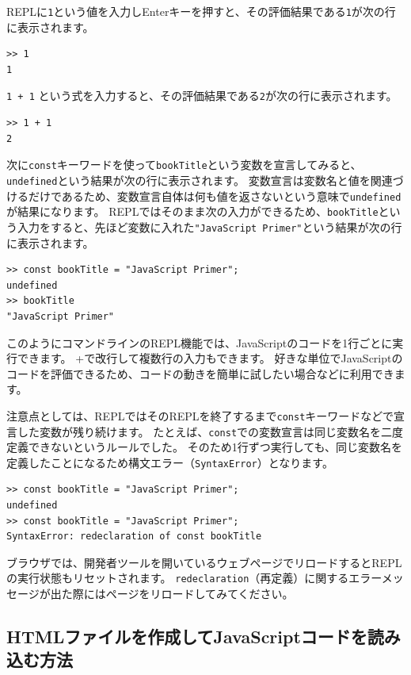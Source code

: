 REPLに\texttt{1}という値を入力しEnterキーを押すと、その評価結果である\texttt{1}が次の行に表示されます。

\begin{lstlisting}
>> 1
1
\end{lstlisting}

\texttt{1 + 1}
という式を入力すると、その評価結果である\texttt{2}が次の行に表示されます。

\begin{lstlisting}
>> 1 + 1
2
\end{lstlisting}

次に\texttt{const}キーワードを使って\texttt{bookTitle}という変数を宣言してみると、\texttt{undefined}という結果が次の行に表示されます。
変数宣言は変数名と値を関連づけるだけであるため、変数宣言自体は何も値を返さないという意味で\texttt{undefined}が結果になります。
REPLではそのまま次の入力ができるため、\texttt{bookTitle}という入力をすると、先ほど変数に入れた\texttt{"JavaScript Primer"}という結果が次の行に表示されます。

\begin{lstlisting}
>> const bookTitle = "JavaScript Primer";
undefined
>> bookTitle
"JavaScript Primer"
\end{lstlisting}

このようにコマンドラインのREPL機能では、JavaScriptのコードを1行ごとに実行できます。
+で改行して複数行の入力もできます。
好きな単位でJavaScriptのコードを評価できるため、コードの動きを簡単に試したい場合などに利用できます。

注意点としては、REPLではそのREPLを終了するまで\texttt{const}キーワードなどで宣言した変数が残り続けます。
たとえば、\texttt{const}での変数宣言は同じ変数名を二度定義できないというルールでした。
そのため1行ずつ実行しても、同じ変数名を定義したことになるため構文エラー（\texttt{SyntaxError}）となります。

\begin{lstlisting}
>> const bookTitle = "JavaScript Primer";
undefined
>> const bookTitle = "JavaScript Primer";
SyntaxError: redeclaration of const bookTitle
\end{lstlisting}

ブラウザでは、開発者ツールを開いているウェブページでリロードするとREPLの実行状態もリセットされます。
\texttt{redeclaration}（再定義）に関するエラーメッセージが出た際にはページをリロードしてみてください。

\hypertarget{js-in-html}{%
\subsection{HTMLファイルを作成してJavaScriptコードを読み込む方法}\label{js-in-html}}

